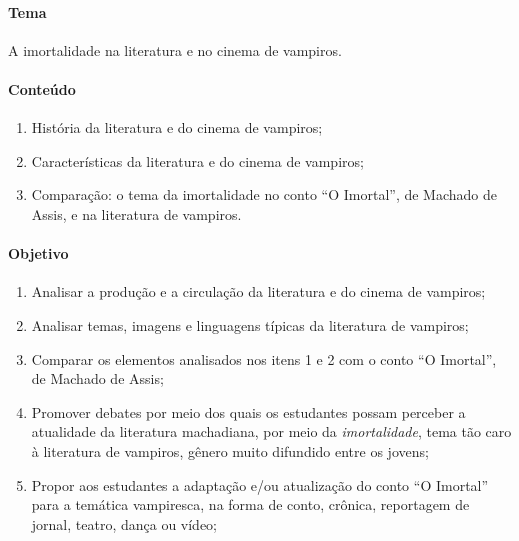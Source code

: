 \documentclass{extarticle}
\begin{document}

\paragraph{Tema} A imortalidade na literatura e no cinema de vampiros.


\paragraph{Conteúdo}
\begin{enumerate}
\item História da literatura e do cinema de vampiros; 

\item Características da literatura e do cinema de vampiros; 

\item Comparação: o
tema da imortalidade no conto ``O Imortal'', de Machado de Assis, e na
literatura de vampiros.
\end{enumerate}

\paragraph{Objetivo} 
\begin{enumerate}
\item Analisar a produção e a circulação da literatura e
do cinema de vampiros; 

\item Analisar temas, imagens e linguagens típicas
da literatura de vampiros; 

\item Comparar os elementos analisados nos itens
1 e 2 com o conto ``O Imortal'', de Machado de Assis; 

\item Promover
debates por meio dos quais os estudantes possam perceber a atualidade da
literatura machadiana, por meio da \emph{imortalidade}, tema tão caro à
literatura de vampiros, gênero muito difundido entre os jovens; 

\item
Propor aos estudantes a adaptação e/ou atualização do conto ``O
Imortal'' para a temática vampiresca, na forma de conto, crônica,
reportagem de jornal, teatro, dança ou vídeo;
\end{enumerate}
\end{document}
